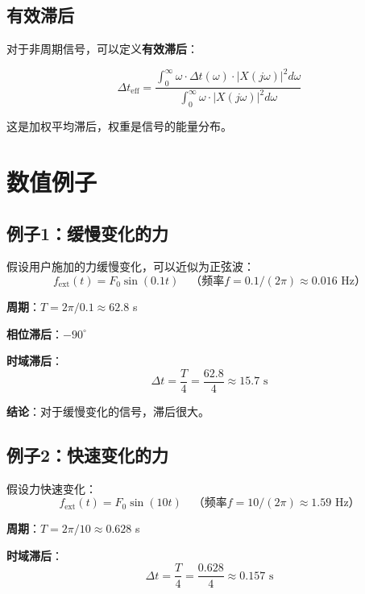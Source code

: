 \documentclass[12pt,a4paper]{article}
\begin{document}
\subsection{有效滞后}

对于非周期信号，可以定义\textbf{有效滞后}：

\begin{equation}
\Delta t_{\text{eff}} = \frac{\int_0^{\infty} \omega \cdot \Delta t(\omega) \cdot |X(j\omega)|^2 d\omega}{\int_0^{\infty} \omega \cdot |X(j\omega)|^2 d\omega}
\end{equation}

这是加权平均滞后，权重是信号的能量分布。

\section{数值例子}

\subsection{例子1：缓慢变化的力}

假设用户施加的力缓慢变化，可以近似为正弦波：
\begin{equation}
f_{\text{ext}}(t) = F_0 \sin(0.1t) \quad \text{（频率$f = 0.1/(2\pi) \approx 0.016$ Hz）}
\end{equation}

\textbf{周期}：$T = 2\pi/0.1 \approx 62.8$ s

\textbf{相位滞后}：$-90^\circ$

\textbf{时域滞后}：
\begin{equation}
\Delta t = \frac{T}{4} = \frac{62.8}{4} \approx 15.7 \text{ s}
\end{equation}

\textbf{结论}：对于缓慢变化的信号，滞后很大。

\subsection{例子2：快速变化的力}

假设力快速变化：
\begin{equation}
f_{\text{ext}}(t) = F_0 \sin(10t) \quad \text{（频率$f = 10/(2\pi) \approx 1.59$ Hz）}
\end{equation}

\textbf{周期}：$T = 2\pi/10 \approx 0.628$ s

\textbf{时域滞后}：
\begin{equation}
\Delta t = \frac{T}{4} = \frac{0.628}{4} \approx 0.157 \text{ s}
\end{equation}
\end{document}

